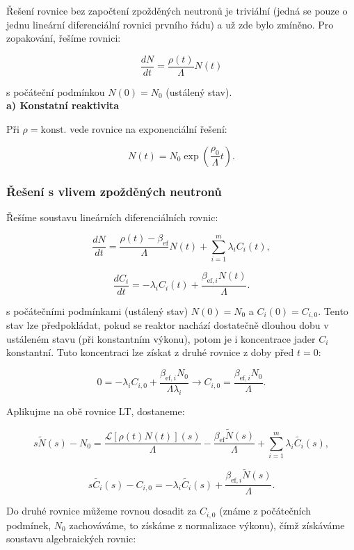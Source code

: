 Řešení rovnice bez započtení zpožděných neutronů je triviální (jedná se pouze o jednu lineární diferenciální rovnici prvního řádu) a už zde bylo zmíněno. Pro zopakování, řešíme rovnici:

$$ \dfrac{dN}{dt} = \dfrac{\rho (t)}{\Lambda} N(t) $$

s počáteční podmínkou $N(0) = N_0$ (ustálený stav).\\

\textbf{a) Konstatní reaktivita}

Při $\rho = \text{konst.}$ vede rovnice na exponenciální řešení:

\begin{equation}
  \boxed{
  N(t) = N_0 \exp \left ( \dfrac{\rho_0}{\Lambda} t \right ).
  \label{kinetika_reseni}}
\end{equation}

\subsubsection{Řešení s vlivem zpožděných neutronů}

Řešíme soustavu lineárních diferenciálních rovnic:

$$ \dfrac{dN}{dt} = \dfrac{\rho(t) - \beta_{\text{ef}}}{\Lambda} N(t) + \sum_{i=1}^m \lambda_i C_i(t), $$

$$ \dfrac{dC_i}{dt} = -\lambda_i C_i(t) + \dfrac{\beta_{\text{ef},i}  N(t)}{\Lambda}. $$

s počátečními podmínkami (ustálený stav) $N(0) = N_0$ a $C_i(0) = C_{i,0}$. Tento stav lze předpokládat, pokud se reaktor nachází dostatečně dlouhou dobu v ustáleném stavu (při konstantním výkonu), potom je i koncentrace jader $C_i$ konstantní. Tuto koncentraci lze získat z druhé rovnice z doby před $t=0$:

$$ 0 = -\lambda_i C_{i,0} + \dfrac{\beta_{\text{ef},i}  N_0}{\Lambda \lambda_i} \rightarrow C_{i,0} = \dfrac{\beta_{\text{ef},i}  N_0}{\Lambda}. $$

Aplikujme na obě rovnice LT, dostaneme:

$$ s \tilde{N}(s) - N_0 = \dfrac{\mathcal{L}[\rho(t) N(t)](s)}{\Lambda} - \dfrac{\beta_{\text{ef}} \tilde{N}(s)}{\Lambda} + \sum_{i=1}^m \lambda_i \tilde{C_i}(s), $$

$$ s \tilde{C_i}(s) - C_{i,0} = -\lambda_i \tilde{C_i}(s) + \dfrac{\beta_{\text{ef},i}  \tilde{N}(s)}{\Lambda}. $$

Do druhé rovnice můžeme rovnou dosadit za $C_{i,0}$ (známe z počátečních podmínek, $N_0$ zachováváme, to získáme z normalizace výkonu), čímž získáváme soustavu algebraických rovnic:

